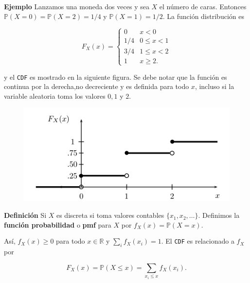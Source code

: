 \documentclass{article}\usepackage[]{graphicx}\usepackage[]{color}
\begin{document}
\vspace{0.5cm}

\textbf{Ejemplo} Lanzamos una moneda dos veces y sea $X$ el n\'umero de caras. Entonces $\mathbb{P}(X = 0) = \mathbb{P}(X = 2) = 1/4$ y $\mathbb{P}(X = 1) = 1/2$. La funci\'on distribuci\'on es

\[
F_{X}(x) = \begin{cases}
0 & x < 0\\
1/4 & 0 \leq x < 1\\
3/4 & 1 \leq x < 2\\
1 & x \geq 2.
\end{cases}
\]

\vspace{0.2cm}

y el \texttt{CDF} es mostrado en la siguiente figura. Se debe notar que la funci\'on es continua por la derecha,no decreciente y es definida para todo $x$, incluso si la variable aleatoria toma los valores $0, 1$ y $2$.

\vspace{0.2cm}
\begin{figure}[h]
\centering
\includegraphics[scale=.55]{graff1-o.png}
\end{figure}

\vspace{0.5cm}

\textbf{Definici\'on} Si $X$ es discreta si toma valores contables $\{x_1, x_2, \dots \}$. Definimos la \textbf{\mbox{funci\'on} probabilidad} o \textbf{pmf} para $X$ por $f_{X}(x) = \mathbb{P}(X = x)$. 

\vspace{0.5cm}

As\'i, $f_{X}(x) \geq 0$ para todo $x \in \mathbb{R}$ y $\sum_{i}f_{X}(x_i) =1$. El \texttt{CDF} es relacionado a $f_{X}$ por

\[
F_{X}(x) = \mathbb{P}(X \leq x) = \sum_{x_i \leq x}f_{X}(x_i).
\]
\end{document}
